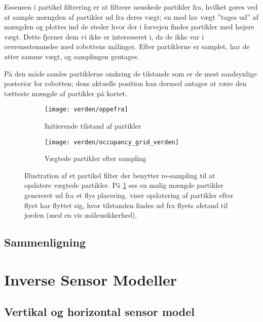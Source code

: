 Essensen i partikel filtrering er at filtrere uønskede partikler fra, hvilket gøres ved at sample mængden af partikler ud fra deres vægt; en med lav vægt ''tages ud'' af mængden og plottes ind de steder hvor der i forvejen findes partikler med højere vægt.
Dette fjerner dem vi ikke er interesseret i, da de ikke var i overensstemmelse med robottens målinger.
Efter partiklerne er samplet, har de atter samme vægt, og samplingen gentages.

På den måde samles partiklerne omkring de tilstande som er de mest sandsynlige posterior for robotten; dens aktuelle position kan dermed antages at være den tætteste mængde af partikler på kortet.

\begin{figure}[h] %
\centering
	\begin{subfigure}[b]{.45\textwidth}
	\centering
	\texttt{[image: verden/oppefra]}
	\caption{Initierende tilstand af partikler}
	\label{map:particles1}
	\end{subfigure}
	\begin{subfigure}[b]{.45\textwidth}
	\centering
	\texttt{[image: verden/occupancy\_grid\_verden]}
	\caption{Vægtede partikler efter sampling}
	\label{map:particles2}
	\end{subfigure}
\caption{Illustration af et partikel filter der benytter re-sampling til at opdatere vægtede partikler. 
På \cref{map:particles1} ses en mulig mængde partikler genereret ud fra et flys placering.
 viser opdatering af partikler efter flyet har flyttet sig, hvor tilstanden findes ud fra flyets afstand til jorden (med en vis måleusikkerhed).}
\label{map:particles}
\end{figure}

\subsection{Sammenligning}



\section{Inverse Sensor Modeller}


\subsection{Vertikal og horizontal sensor model}

